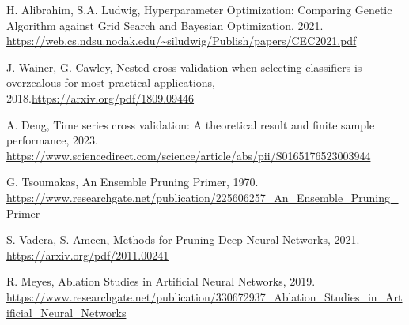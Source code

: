 \documentclass[a4paper,12pt]{report}
\begin{document}
\begin{thebibliography}{99}
		H. Alibrahim, S.A. Ludwig, Hyperparameter Optimization: Comparing Genetic Algorithm against Grid Search and Bayesian Optimization, 2021. \url{https://web.cs.ndsu.nodak.edu/~siludwig/Publish/papers/CEC2021.pdf}
		 
		J. Wainer, G. Cawley, Nested cross-validation when selecting classifiers is overzealous for most practical applications, 2018.\url{https://arxiv.org/pdf/1809.09446}
		 
		A. Deng, Time series cross validation: A theoretical result and finite sample performance, 2023. \url{https://www.sciencedirect.com/science/article/abs/pii/S0165176523003944}
		 
		G. Tsoumakas, An Ensemble Pruning Primer, 1970. \url{https://www.researchgate.net/publication/225606257_An_Ensemble_Pruning_Primer}
		 
		S. Vadera, S. Ameen, Methods for Pruning Deep Neural Networks, 2021. \url{https://arxiv.org/pdf/2011.00241}
		
		R. Meyes, Ablation Studies in Artificial Neural Networks, 2019. \url{https://www.researchgate.net/publication/330672937_Ablation_Studies_in_Artificial_Neural_Networks}
	\end{thebibliography}
		
\end{document}
